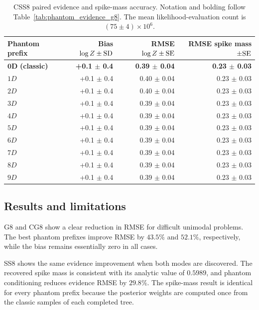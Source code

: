 \documentclass[pdflatex,sn-basic,icol]{sn-jnl}
\theoremstyle{plain}
\theoremstyle{definition}
\begin{document}
\begin{table}[t]
\caption{CSS8 paired evidence and spike-mass accuracy. Notation and bolding follow Table~\ref{tab:phantom_evidence_g8}. The mean likelihood-evaluation count is $(75\pm4)\times10^6$.}
\label{tab:phantom_evidence_css8}
\centering
\scriptsize
\setlength{\tabcolsep}{3.0pt}
\renewcommand{\arraystretch}{0.92}
\begin{tabular}{lrrr}
\toprule
Phantom prefix & Bias $\log Z\mathbin{\pm}{\rm SD}$ & RMSE $\log Z\mathbin{\pm}{\rm SE}$ & RMSE spike mass $\mathbin{\pm}{\rm SE}$ \\
\midrule
$\boldsymbol{0D}$ \textbf{(classic)} & \textbf{+0.1 $\pm$ 0.4} & \textbf{0.39 $\pm$ 0.04} & \textbf{0.23 $\pm$ 0.03} \\
$1D$ & +0.1 $\pm$ 0.4 & 0.40 $\pm$ 0.04 & 0.23 $\pm$ 0.03 \\
$2D$ & +0.1 $\pm$ 0.4 & 0.40 $\pm$ 0.04 & 0.23 $\pm$ 0.03 \\
$3D$ & +0.1 $\pm$ 0.4 & 0.39 $\pm$ 0.04 & 0.23 $\pm$ 0.03 \\
$4D$ & +0.1 $\pm$ 0.4 & 0.39 $\pm$ 0.04 & 0.23 $\pm$ 0.03 \\
$5D$ & +0.1 $\pm$ 0.4 & 0.39 $\pm$ 0.04 & 0.23 $\pm$ 0.03 \\
$6D$ & +0.1 $\pm$ 0.4 & 0.39 $\pm$ 0.04 & 0.23 $\pm$ 0.03 \\
$7D$ & +0.1 $\pm$ 0.4 & 0.39 $\pm$ 0.04 & 0.23 $\pm$ 0.03 \\
$8D$ & +0.1 $\pm$ 0.4 & 0.39 $\pm$ 0.04 & 0.23 $\pm$ 0.03 \\
$9D$ & +0.1 $\pm$ 0.4 & 0.39 $\pm$ 0.04 & 0.23 $\pm$ 0.03 \\
\bottomrule
\end{tabular}
\end{table}

\clearpage
\subsection{Results and limitations}

G8 and CG8 show a clear reduction in RMSE for difficult unimodal problems.
The best phantom prefixes improve RMSE by $43.5\%$ and $52.1\%$, respectively, while the bias remains essentially zero in all cases.

SS8 shows the same evidence improvement when both modes are discovered.
The recovered spike mass is consistent with its analytic value of $0.5989$, and phantom conditioning reduces evidence RMSE by $29.8\%$.
The spike-mass result is identical for every phantom prefix because the posterior weights are computed once from the classic samples of each completed tree.
\end{document}
